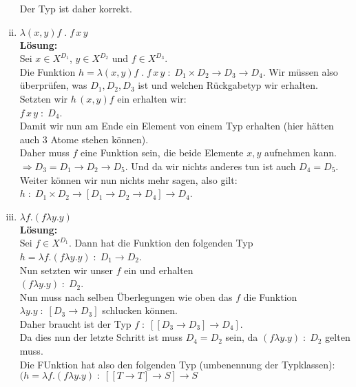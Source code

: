 \documentclass[11pt,a4paper,ngerman]{article}
\begin{document}
\begin{enumerate}[(i)]
         Der Typ ist daher korrekt.

   \item $\lambda (x , y) f \; . \; f \, x \, y$\\
      \textbf{Lösung:}\\
         Sei $x \in X^{D_1}$, $y \in X^{D_2}$ und $f \in X^{D_3}$.\\
         Die Funktion $h = \lambda (x,y)f \; . \; f \, x \, y \; : \; D_1 
         \times D_2 \rightarrow D_3 \rightarrow D_4$. Wir müssen also überprüfen,
         was $D_1,D_2,D_3$ ist und welchen Rückgabetyp wir erhalten.\\

         Setzten wir $h \, (x,y) f$ ein erhalten wir:\\
         $f \, x \, y \; : \; D_4$.\\
         Damit wir nun am Ende ein Element von einem Typ erhalten (hier hätten auch 3 Atome stehen können).\\
         Daher muss $f$ eine Funktion sein, die beide Elemente $x,y$ aufnehmen kann.\\
         $\Rightarrow D_3 = D_1 \rightarrow D_2 \rightarrow D_5$. Und da wir nichts anderes tun ist auch
         $D_4 = D_5$.\\
         Weiter können wir nun nichts mehr sagen, also gilt:\\
         $h \; : \; D_1 \times D_2 \rightarrow [D_1 \rightarrow D_2 \rightarrow D_4] \rightarrow D_4$.

   \item $\lambda f. (f \lambda y.y)$\\
      \textbf{Lösung:}\\
         Sei $f \in X^{D_1}$. Dann hat die Funktion den folgenden Typ
         $h = \lambda f. (f \lambda y.y) \; : \; D_1 \rightarrow D_2$.\\

         Nun setzten wir unser $f$ ein und erhalten\\
         $(f \lambda y.y) \; : \; D_2$.\\
         Nun muss nach selben Überlegungen wie oben das $f$ die Funktion 
         $\lambda y.y \; : \; [D_3 \rightarrow D_3]$ schlucken können.\\
         
         Daher braucht ist der Typ $f \; : \; [ [D_3 \rightarrow D_3 ] \rightarrow D_4]$.\\
         Da dies nun der letzte Schritt ist muss $D_4 = D_2$ sein, 
         da $(f \lambda y.y) \; : \; D_2$ gelten muss.\\

         Die FUnktion hat also den folgenden Typ (umbenennung der Typklassen):\\
         $(h = \lambda f . (f \lambda y.y) \; : \; [[T \rightarrow T] \rightarrow S] \rightarrow S$

\end{enumerate}
\end{document}
